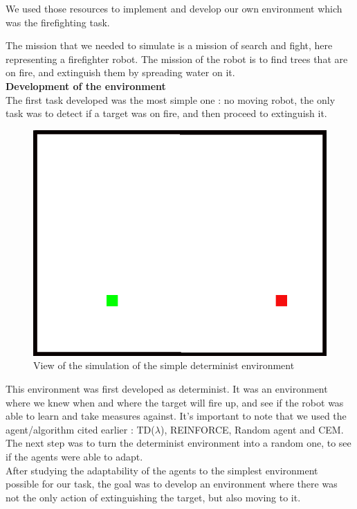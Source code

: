 \documentclass[conference]{IEEEtran}
\begin{document}
We used those resources to implement and develop our own environment which was the firefighting task.

The mission that we needed to simulate is a mission of search and fight, here representing a firefighter robot. The mission of the robot is to find trees that are on fire, and extinguish them by spreading water on it.\\

\textbf{Development of the environment}\\

The first task developed was the most simple one : no moving robot, the only task was to detect if a target was on fire, and then proceed to extinguish it.\\

\begin{figure}
  \includegraphics[scale = 0.4]{images/1Dultrasimple.png}
  \caption{View of the simulation of the simple determinist environment}
  \label{fig:my-figure}
\end{figure}

This environment was first developed as determinist. It was an environment where we knew when and where the target will fire up, and see if the robot was able to learn and take measures against.
It's important to note that we used the agent/algorithm cited earlier : TD($\lambda$), REINFORCE, Random agent and CEM.\\
The next step was to turn the determinist environment into a random one, to see if the agents were able to adapt.\\
After studying the adaptability of the agents to the simplest environment possible for our task, the goal was to develop an environment where there was not the only action of extinguishing the target, but also moving to it.\\
\end{document}
